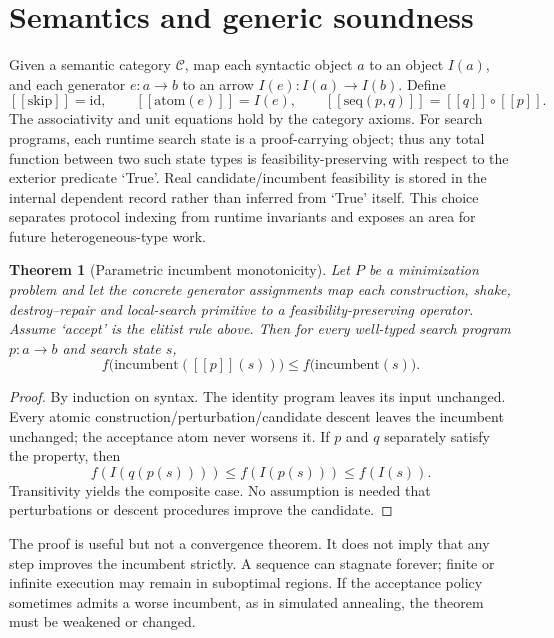 \documentclass[11pt,a4paper]{article}
\newtheorem{theorem}{Theorem}
\newcommand{\den}[1]{\left[\!\left[ #1 \right]\!\right]}
\begin{document}
\section{Semantics and generic soundness}
Given a semantic category $\mathcal{C}$, map each syntactic object $a$ to
an object $I(a)$, and each generator $e:a\to b$ to an arrow
$I(e):I(a)\to I(b)$. Define
\begin{equation}
 \den{\mathrm{skip}}=\mathrm{id},\qquad
 \den{\mathrm{atom}(e)}=I(e),\qquad
 \den{\mathrm{seq}(p,q)}=\den q\circ\den p.
\end{equation}
The associativity and unit equations hold by the category axioms.
For search programs, each runtime search state is a proof-carrying object;
thus any total function between two such state types is feasibility-preserving
with respect to the exterior predicate `True'. Real candidate/incumbent
feasibility is stored in the internal dependent record rather than inferred
from `True' itself. This choice separates protocol indexing from runtime
invariants and exposes an area for future heterogeneous-type work.

\begin{theorem}[Parametric incumbent monotonicity]
Let $P$ be a minimization problem and let the concrete generator assignments
map each construction, shake, destroy--repair and local-search primitive to
a feasibility-preserving operator. Assume `accept' is the elitist rule above.
Then for every well-typed search program $p:a\to b$ and search state $s$,
\begin{equation}
 f\bigl(\mathrm{incumbent}(\den{p}(s))\bigr)
 \le f\bigl(\mathrm{incumbent}(s)\bigr).
\end{equation}
\end{theorem}
\begin{proof}
By induction on syntax. The identity program leaves its input unchanged.
Every atomic construction/perturbation/candidate descent leaves the
incumbent unchanged; the acceptance atom never worsens it. If $p$ and
$q$ separately satisfy the property, then
\[
 f(I(q(p(s))))\le f(I(p(s)))\le f(I(s)).
\]
Transitivity yields the composite case. No assumption is needed that
perturbations or descent procedures improve the candidate.
\end{proof}

The proof is useful but not a convergence theorem. It does not imply that
any step improves the incumbent strictly. A sequence can stagnate forever;
finite or infinite execution may remain in suboptimal regions. If the
acceptance policy sometimes admits a worse incumbent, as in simulated
annealing, the theorem must be weakened or changed.
\end{document}
